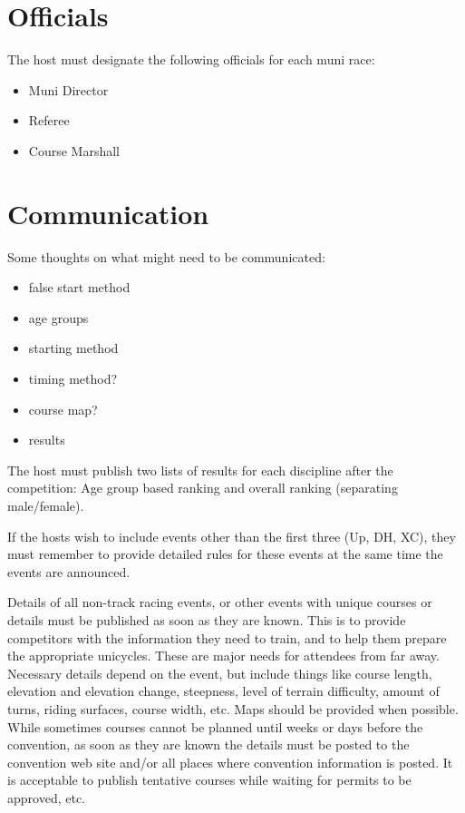 \section{Officials}

The host must designate the following officials for each muni race:
\begin{itemize}
\item Muni Director
\item Referee
\item Course Marshall
\end{itemize}

\section{Communication}

\begin{comment2016}
Some thoughts on what might need to be communicated:
\begin{itemize}
\item false start method
\item age groups
\item starting method
\item timing method?
\item course map?
\item results
\end{itemize}
\end{comment2016}

The host must publish two lists of results for each discipline after the competition: Age group based ranking and overall ranking (separating
male/female).

If the hosts wish to include events other than the first three (Up, DH, XC), they must remember to provide detailed rules for these events at the same time the events are announced.

Details of all non-track racing events, or other events with unique courses or details must be published as soon as they are known. 
This is to provide competitors with the information they need to train, and to help them prepare the appropriate unicycles.
These are major needs for attendees from far away. 
Necessary details depend on the event, but include things like course length, elevation and elevation change, steepness, level of terrain difficulty, amount of turns, riding surfaces, course width, etc.
Maps should be provided when possible. 
While sometimes courses cannot be planned until weeks or days before the convention, as soon as they are known the details must be posted to the convention web site and/or all places where convention information is posted. 
It is acceptable to publish tentative courses while waiting for permits to be approved, etc.

